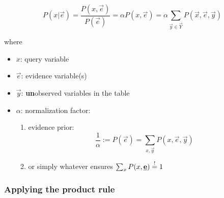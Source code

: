 \begin{frame}\frametitle{\subsubsecname}

\begin{equation}
P(x | \vec e)
= \frac{P(x, \vec e)}{P(\vec e)}
= \alpha P(x, \vec e)
= \alpha \sum_{\vec y \in \vec Y} P(\vec x, \vec e, \vec y)
\end{equation}

where
\begin{itemize}
\item[] $x$: query variable
\item[] $\vec e$: evidence variable(s)
\item[] $\vec y$: \textbf{un}observed variables in the table
\item[] $\alpha$: normalization factor:


\pause

\begin{enumerate}
\item evidence prior:
\begin{equation}
\frac{1}{\alpha} := P(\vec e) = \sum_{x, \vec y} P(x, \vec e, \vec y)  
\end{equation}
\item or simply whatever ensures $\sum_{ x} P(x, \underline{\mathbf{e}}) \stackrel{\mathrm{!}}{=} 1$
\end{enumerate}

\end{itemize}
    
\end{frame}

\subsubsection{Applying the product rule}

